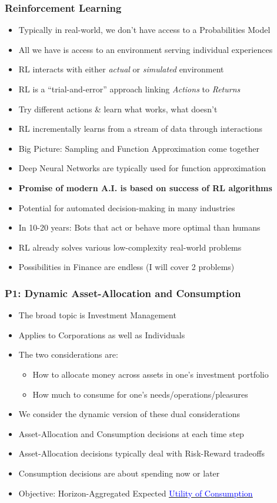 \documentclass[handout]{beamer}
\begin{document}
\begin{frame}
\frametitle{Reinforcement Learning}
\pause
\begin{itemize}[<+->]
\item Typically in real-world, we don't have access to a Probabilities Model
\item All we have is access to an environment serving individual experiences
\item RL interacts with either {\em actual} or {\em simulated} environment
\item RL is a ``trial-and-error'' approach linking {\em Actions} to {\em Returns}
\item Try different actions \& learn what works, what doesn't
\item RL incrementally learns from a stream of data through interactions
\item Big Picture: Sampling and Function Approximation come together
\item Deep Neural Networks are typically used for function approximation
\item {\bf Promise of modern A.I. is based on success of RL algorithms}
\item Potential for automated decision-making in many industries
\item In 10-20 years: Bots that act or behave more optimal than humans
\item RL already solves various low-complexity real-world problems
\item Possibilities in Finance are endless (I will cover 2 problems)
\end{itemize}
\end{frame}


\begin{frame}
\frametitle{P1: Dynamic Asset-Allocation and Consumption}
\pause
\begin{itemize}[<+->]
\item The broad topic is Investment Management
\item Applies to Corporations as well as Individuals
\item The two considerations are:
\pause
\begin{itemize}[<+->]
\item How to allocate money across assets in one's investment portfolio
\item How much to consume for one's needs/operations/pleasures
\end{itemize}
\item We consider the dynamic version of these dual considerations
\item Asset-Allocation and Consumption decisions at each time step
\item Asset-Allocation decisions typically deal with Risk-Reward tradeoffs
\item Consumption decisions are about spending now or later
\item Objective: Horizon-Aggregated Expected \href{https://github.com/coverdrive/technical-documents/blob/master/finance/cme241/Tour-UtilityTheory.pdf}{\underline{\textcolor{blue}{Utility of Consumption}}}
\end{itemize}
\end{frame}
\end{document}
